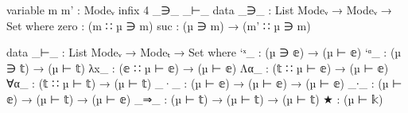 \begin{code}[hide]
variable m m' : Modeᵥ
infix  4  _∋_  _⊢_
data _∋_ : List Modeᵥ → Modeᵥ → Set where
  zero  : (m ∷ µ ∋ m)
  suc   : (µ ∋ m) → (m' ∷ µ ∋ m)
\end{code}

\begin{frame}
\begin{code}
data _⊢_ : List Modeᵥ → Modeₜ → Set where
  `ˣ_   : (µ ∋ 𝕖) → (µ ⊢ 𝕖)
  `ᵅ_   : (µ ∋ 𝕥) → (µ ⊢ 𝕥)
  λx_   : (𝕖 ∷ µ ⊢ 𝕖) → (µ ⊢ 𝕖)
  Λα_   : (𝕥 ∷ µ ⊢ 𝕖) → (µ ⊢ 𝕖)
  ∀α_   : (𝕥 ∷ µ ⊢ 𝕥) → (µ ⊢ 𝕥)
  _·_   : (µ ⊢ 𝕖) → (µ ⊢ 𝕖) → (µ ⊢ 𝕖)
  _∙_   : (µ ⊢ 𝕖) → (µ ⊢ 𝕥) → (µ ⊢ 𝕖)
  _⇒_   : (µ ⊢ 𝕥) → (µ ⊢ 𝕥) → (µ ⊢ 𝕥)
  ★     : (µ ⊢ 𝕜)
\end{code}
\end{frame}
